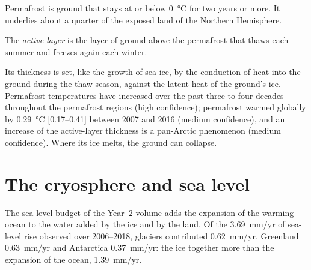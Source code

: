 Permafrost is ground that stays at or below \qty{0}{\celsius} for two years
or more. It underlies about a quarter of the exposed land of the Northern
Hemisphere.

\begin{definition}\label{def:b3:glaciology:permafrost}
The \emph{active layer} is the layer of ground above
the permafrost that thaws each summer and freezes again each winter.
\end{definition}

Its thickness is set, like the growth of sea ice, by the conduction of heat
into the ground during the thaw season, against the latent heat of the
ground's ice. Permafrost temperatures have increased over the past three to
four decades throughout the permafrost regions (high confidence);
permafrost warmed globally by \qty{0.29}{\celsius} [\numrange{0.17}{0.41}]
between 2007 and 2016 (medium confidence), and an increase of the
active-layer thickness is a pan-Arctic phenomenon (medium confidence).
Where its ice melts, the ground can collapse.

\section{The cryosphere and sea level}\label{sec:b3:glaciology:sea-level}

The sea-level budget of the Year~2 volume adds the expansion of the warming
ocean to the water added by the ice and by the land. Of the
\qty{3.69}{mm/yr} of sea-level rise observed over 2006--2018, glaciers
contributed \qty{0.62}{mm/yr}, Greenland \qty{0.63}{mm/yr} and Antarctica
\qty{0.37}{mm/yr}: the ice together more than the expansion of the ocean,
\qty{1.39}{mm/yr}.

